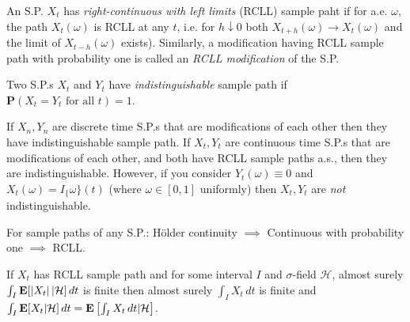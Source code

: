 \begin{definition*}
An S.P. $X_t$ has \emph{right-continuous with left limits} (RCLL) sample paht if for a.e. $\omega$, the path $X_t(\omega)$ is RCLL at any $t$, i.e. for $h \downarrow 0$ both $X_{t+h}(\omega) \to X_t(\omega)$ and the limit of $X_{t-h}(\omega)$ exists). Similarly, a modification having RCLL sample path with probability one is called an \emph{RCLL modification} of the S.P.
\end{definition*}

\begin{definition*}
Two S.P.s $X_t$ and $Y_t$ have \emph{indistinguishable} sample path if $\mathbf P(X_t = Y_t \text{ for all } t) = 1$.
\end{definition*}

\begin{exercise*}
If $X_n, Y_n$ are discrete time S.P.s that are modifications of each other then they have indistinguishable sample path. If $X_t,Y_t$ are continuous time S.P.s that are modifications of each other, and both have RCLL sample paths a.s., then they are indistinguishable. However, if you consider $Y_t(\omega) \equiv 0$ and $X_t(\omega) = I_\{\omega\}(t)$ (where $\omega \in [0,1]$ uniformly) then $X_t,Y_t$ are \emph{not} indistinguishable.
\end{exercise*}

\begin{proposition*}
For sample paths of any S.P.: H\"older continuity $\implies$ Continuous with probability one $\implies$ RCLL.
\end{proposition*}

\begin{theorem*}
If $X_t$ has RCLL sample path and for some interval $I$ and $\sigma$-field $\mathcal H$, almost surely $\int_I \mathbf{E}[\left\lvert X_t \right\rvert|\mathcal H] \, dt$ is finite then almost surely $\int_I X_t\,dt$ is finite and $\int_I \mathbf{E}[X_t | \mathcal H]\,dt = \mathbf{E} \left[ \int_I X_t \, dt | \mathcal H \right]$.
\end{theorem*}